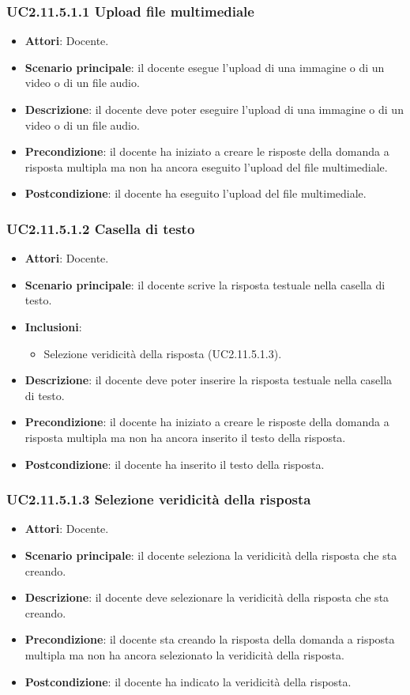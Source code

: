 \subsubsection{UC2.11.5.1.1 Upload file multimediale}
\begin{itemize}
\item \textbf{Attori}: Docente.
\item \textbf{Scenario principale}: il docente esegue l'upload di una immagine o di un video o di un file audio.
\item \textbf{Descrizione}: il docente deve poter eseguire l'upload di una immagine o di un video o di un file audio.
\item \textbf{Precondizione}: il docente ha iniziato a creare le risposte della domanda a risposta multipla ma non ha ancora eseguito l'upload del file multimediale.
\item \textbf{Postcondizione}: il docente ha eseguito l'upload del file multimediale.
\end{itemize}
\subsubsection{UC2.11.5.1.2 Casella di testo}
\begin{itemize}
\item \textbf{Attori}: Docente.
\item \textbf{Scenario principale}: il docente scrive la risposta testuale nella casella di testo.
\item \textbf{Inclusioni}:
\begin{itemize}
\item Selezione veridicità della risposta (UC2.11.5.1.3).
\end{itemize}
\item \textbf{Descrizione}: il docente deve poter inserire la risposta testuale nella casella di testo.
\item \textbf{Precondizione}: il docente ha iniziato a creare le risposte della domanda a risposta multipla ma non ha ancora inserito il testo della risposta.
\item \textbf{Postcondizione}: il docente ha inserito il testo della risposta.
\end{itemize}
\subsubsection{UC2.11.5.1.3 Selezione veridicità della risposta}
\begin{itemize}
\item \textbf{Attori}: Docente.
\item \textbf{Scenario principale}: il docente seleziona la veridicità della risposta che sta creando.
\item \textbf{Descrizione}: il docente deve selezionare la veridicità della risposta che sta creando.
\item \textbf{Precondizione}: il docente sta creando la risposta della domanda a risposta multipla ma non ha ancora selezionato la veridicità della risposta.
\item \textbf{Postcondizione}: il docente ha indicato la veridicità della risposta.
\end{itemize}
